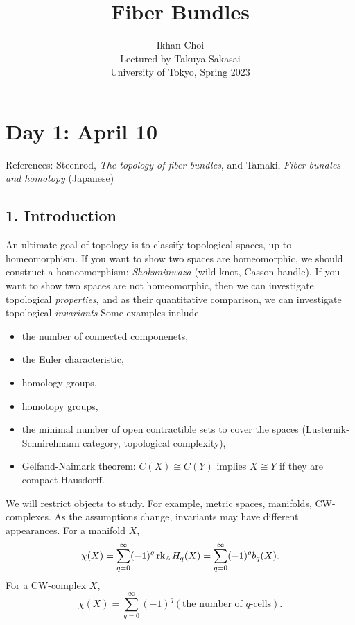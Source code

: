 \documentclass{../../small}
\begin{document}
\title{Fiber Bundles}
\author{Ikhan Choi\\Lectured by Takuya Sakasai\\University of Tokyo, Spring 2023}
\maketitle
\tableofcontents

\newpage
\section{Day 1: April 10}

References:
Steenrod, \emph{The topology of fiber bundles}, and Tamaki, \emph{Fiber bundles and homotopy} (Japanese)

\subsection*{1. Introduction}

An ultimate goal of topology is to classify topological spaces, up to homeomorphism.
If you want to show two spaces are homeomorphic, we should construct a homeomorphism: \emph{Shokuninwaza} (wild knot, Casson handle).
If you want to show two spaces are not homeomorphic, then we can investigate topological \emph{properties}, and as their quantitative comparison, we can investigate topological \emph{invariants}
Some examples include
\begin{itemize}
\item the number of connected componenets,
\item the Euler characteristic,
\item homology groups,
\item homotopy groups,
\item the minimal number of open contractible sets to cover the spaces (Lusternik-Schnirelmann category, topological complexity),
\item Gelfand-Naimark theorem: $C(X)\cong C(Y)$ implies $X\cong Y$ if they are compact Hausdorff.
\end{itemize}


We will restrict objects to study.
For example, metric spaces, manifolds, CW-complexes.
As the assumptions change, invariants may have different appearances.
For a manifold $X$,
\[\chi(X)=\sum_{q=0}^\infty(-1)^q\operatorname{rk}_{\mathbb{Z}} H_q(X)=\sum_{q=0}^\infty(-1)^qb_q(X).\]
For a CW-complex $X$,
\[\chi(X)=\sum_{q=0}^\infty(-1)^q(\text{the number of $q$-cells}).\]
\end{document}
